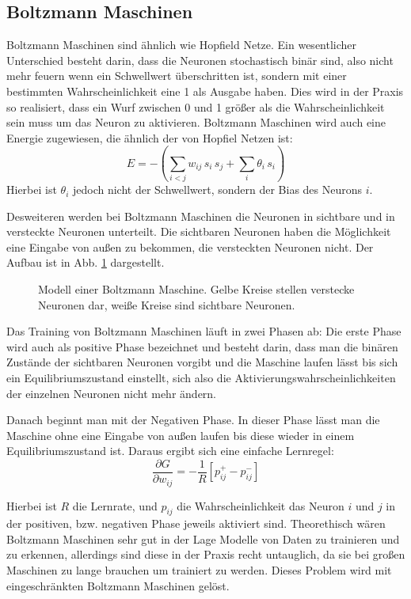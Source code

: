 \documentclass[12pt]{article}
\begin{document}
\subsection{Boltzmann Maschinen}	
Boltzmann Maschinen sind ähnlich wie Hopfield Netze. Ein wesentlicher Unterschied besteht darin, dass die Neuronen stochastisch binär sind, also nicht mehr feuern wenn ein Schwellwert überschritten ist, sondern mit einer bestimmten Wahrscheinlichkeit eine 1 als Ausgabe haben. Dies wird in der Praxis so realisiert, dass ein Wurf zwischen 0 und 1 größer als die Wahrscheinlichkeit sein muss um das Neuron zu aktivieren. Boltzmann Maschinen wird auch eine Energie zugewiesen, die ähnlich der von Hopfiel Netzen ist:
\begin{equation}
E = -\left(\sum_{i<j} w_{ij} \, s_i \, s_j + \sum_i \theta_i \, s_i \right)
\end{equation}
Hierbei ist $\theta_i$ jedoch nicht der Schwellwert, sondern der Bias des Neurons $i$. 

Desweiteren werden bei Boltzmann Maschinen die Neuronen in sichtbare und in versteckte Neuronen unterteilt. Die sichtbaren Neuronen haben die Möglichkeit eine Eingabe von außen zu bekommen, die versteckten Neuronen nicht. Der Aufbau ist in Abb. \ref{Boltzmannmaschine} dargestellt.

\begin{figure}[H]
	\center
	
	\caption{Modell einer Boltzmann Maschine. Gelbe Kreise stellen verstecke Neuronen dar, weiße Kreise sind sichtbare Neuronen.}
	\label{Boltzmannmaschine}
	\end{figure}
	
Das Training von Boltzmann Maschinen läuft in zwei Phasen ab: Die erste Phase wird auch als positive Phase bezeichnet und besteht darin, dass man die binären Zustände der sichtbaren Neuronen vorgibt und die Maschine laufen lässt bis sich ein Equilibriumszustand einstellt, sich also die Aktivierungswahrscheinlichkeiten der einzelnen Neuronen nicht mehr ändern. 

Danach beginnt man mit der Negativen Phase. In dieser Phase lässt man die Maschine ohne eine Eingabe von außen laufen bis diese wieder in einem Equilibriumszustand ist. Daraus ergibt sich eine einfache Lernregel:
\begin{equation}
\frac{\partial{G}}{\partial{w_{ij}}} = -\frac{1}{R}[p_{ij}^{+}-p_{ij}^{-}]
\end{equation}

Hierbei ist $R$ die Lernrate, und $p_{ij}$ die Wahrscheinlichkeit das Neuron $i$ und $j$ in der positiven, bzw. negativen Phase jeweils aktiviert sind.
Theorethisch wären Boltzmann Maschinen sehr gut in der Lage Modelle von Daten zu trainieren und zu erkennen, allerdings sind diese in der Praxis recht untauglich, da sie bei großen Maschinen zu lange brauchen um trainiert zu werden. Dieses Problem wird mit eingeschränkten Boltzmann Maschinen gelöst.
\end{document}
